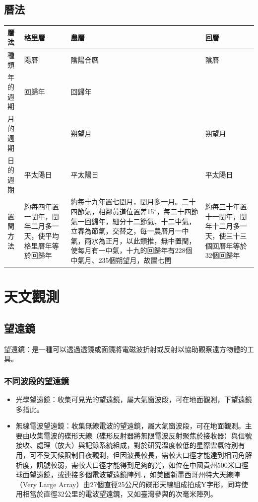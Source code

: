 \documentclass[a4paper,12pt]{report}
\begin{document}
\subsection{曆法}
\begin{longtable}[c]{|p{}|p{}|p{}|p{}|}
\hline
曆法 & 格里曆 & 農曆 & 回曆 \\\hline
種類 & 陽曆 & 陰陽合曆 & 陰曆 \\\hline
年的週期 & 回歸年 & 回歸年 & \\\hline
月的週期 & & 朔望月 & 朔望月 \\\hline
日的週期 & 平太陽日 & 平太陽日 & 平太陽日 \\\hline
置閏方法 & 約每四年置一閏年，閏年二月多一天，使平均格里曆年等於回歸年 & 約每十九年置七閏月，閏月多一月。二十四節氣，相鄰黃道位置差15$^\circ$，每二十四節氣一回歸年，細分十二節氣、十二中氣，立春為節氣，交替之，每一農曆月一中氣，雨水為正月，以此類推，無中置閏，使每月有一中氣，十九的回歸年有228個中氣月、235個朔望月，故置七閏 & 約每三十年置十一閏年，閏年十二月多一天，使三十三個回曆年等於32個回歸年 \\\hline
\end{longtable}
\section{天文觀測}
\subsection{望遠鏡}
望遠鏡：是一種可以透過透鏡或面鏡將電磁波折射或反射以協助觀察遠方物體的工具。
\subsubsection{不同波段的望遠鏡}
\begin{itemize}
\item 光學望遠鏡：收集可見光的望遠鏡，屬大氣窗波段，可在地面觀測，下望遠鏡多指此。
\item 無線電波望遠鏡：收集無線電波的望遠鏡，屬大氣窗波段，可在地面觀測。主要由收集電波的碟形天線（碟形反射器將無限電波反射聚焦於接收器）與信號接收、處理（放大）與記錄系統組成，對於研究溫度較低的星際雲氣特別有用，可不受天候限制日夜觀測，但因波長較長，需較大口徑才能達到相同角解析度，訊號較弱，需較大口徑才能得到足夠的光，如位在中國貴州500米口徑球面望遠鏡，或連接多個電波望遠鏡陣列.，如美國新墨西哥州特大天線陣（Very Large Array）由27個直徑25公尺的碟形天線組成拍成Y字形，同時使用相當於直徑32公里的電波望遠鏡，又如臺灣參與的次毫米陣列。
\end{itemize}
\end{document}
